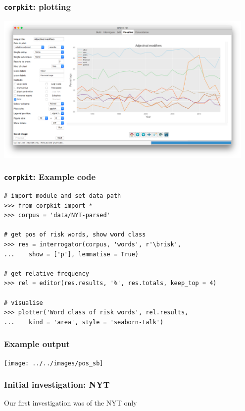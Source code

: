 \documentclass{beamer}       %
\begin{document}
\begin{frame}
    \frametitle{\texttt{corpkit}: plotting}
    \centering
    \includegraphics[width=0.95\textwidth]{../../images/plott}
\end{frame}

\begin{frame}[fragile]
\frametitle{\texttt{corpkit}: Example code}

\begin{verbatim}
# import module and set data path
>>> from corpkit import *
>>> corpus = 'data/NYT-parsed'

# get pos of risk words, show word class
>>> res = interrogator(corpus, 'words', r'\brisk', 
...    show = ['p'], lemmatise = True)

# get relative frequency
>>> rel = editor(res.results, '%', res.totals, keep_top = 4)

# visualise
>>> plotter('Word class of risk words', rel.results, 
...    kind = 'area', style = 'seaborn-talk')
\end{verbatim}
\end{frame}

\begin{frame}
    \frametitle{Example output}
    \centering
    \texttt{[image: ../../images/pos\_sb]}
\end{frame}

\begin{frame}
\frametitle{Initial investigation: NYT}

Our first investigation was of the NYT only

\end{frame}
\end{document}
